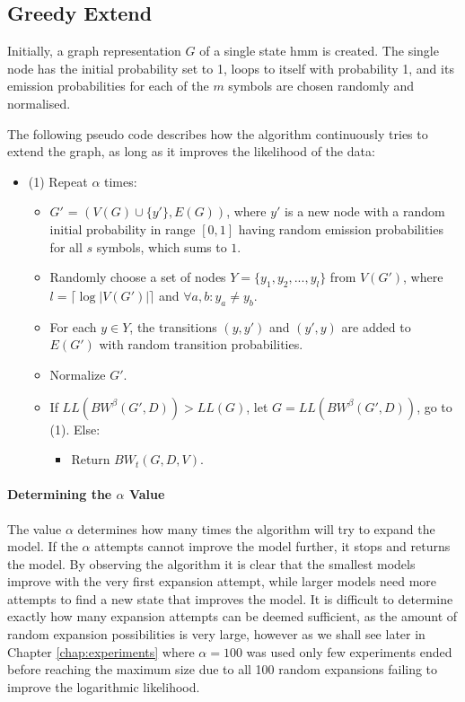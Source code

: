 \subsection{Greedy Extend}
Initially, a graph representation $G$ of a single state \gls{hmm} is created. The single node has the initial probability set to 1, loops to itself with probability 1, and its emission probabilities for each of the $m$ symbols are chosen randomly and normalised.

The following pseudo code describes how the algorithm continuously tries to extend the graph, as long as it improves the likelihood of the data:

\begin{itemize}
\item (1) Repeat $\alpha$ times:
	\begin{itemize}
	\item $G'$ = $(V(G) \cup \{y'\}, E(G))$, where $y'$ is a new node with a random initial probability in range $[0, 1]$ having random emission probabilities for all $s$ symbols, which sums to $1$.
	\item Randomly choose a set of nodes $Y = \{y_1, y_2, ... , y_l\}$ from $V(G')$, where $l = \lceil \log |V(G')| \rceil$ and $\forall a,b: y_a \neq y_b$.
	\item For each $y \in Y$, the transitions $(y, y')$ and $(y', y)$ are added to $E(G')$ with random transition probabilities.
	\item Normalize $G'$.
	\item If $LL(BW^{\beta}(G', D)) > LL(G)$, let $G = LL(BW^{\beta}(G', D))$, go to (1). Else:
	\begin{itemize}
		\item[] Return $BW_t(G, D, V)$.
	\end{itemize}
	\end{itemize}
\end{itemize}

\paragraph{Determining the $\alpha$ Value}

The value $\alpha$ determines how many times the algorithm will try to expand the model. If the $\alpha$ attempts cannot improve the model further, it stops and returns the model. By observing the algorithm it is clear that the smallest models improve with the very first expansion attempt, while larger models need more attempts to find a new state that improves the model. It is difficult to determine exactly how many expansion attempts can be deemed sufficient, as the amount of random expansion possibilities is very large, however as we shall see later in Chapter \ref{chap:experiments} where $\alpha=100$ was used only few experiments ended before reaching the maximum size due to all 100 random expansions failing to improve the logarithmic likelihood.

